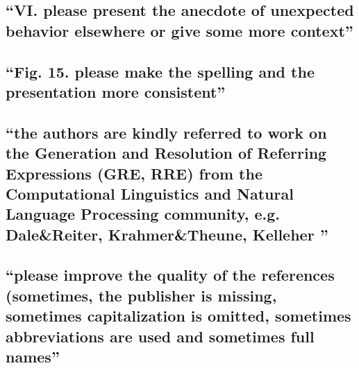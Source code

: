 \documentclass{article}
\begin{document}
\subsection{``VI. please present the anecdote of unexpected behavior elsewhere
or give some more context''}

\subsection{``Fig. 15. please make the spelling and the presentation more
consistent''}

\subsection{``the authors are kindly referred to work on the Generation and
Resolution of Referring Expressions (GRE, RRE) from the Computational
Linguistics and Natural Language Processing community, e.g. Dale\&Reiter,
Krahmer\&Theune, Kelleher ''}

\subsection{``please improve the quality of the references (sometimes, the
publisher is missing, sometimes capitalization is omitted, sometimes
abbreviations are used and sometimes full names''}
\end{document}
